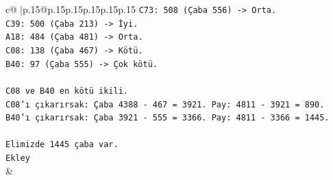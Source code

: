 \documentclass{article}
\begin{document}
{\begin{supertabular}{c@{$\;$}|p{.15\linewidth}@{}p{.15\linewidth}p{.15\linewidth}p{.15\linewidth}p{.15\linewidth}p{.15\linewidth}}
{{{\texttt{C73: 508 (Çaba 556) {-}> Orta.} \\
\texttt{C39: 500 (Çaba 213) {-}> İyi.} \\
\texttt{A18: 484 (Çaba 481) {-}> Orta.} \\
\texttt{C08: 138 (Çaba 467) {-}> Kötü.} \\
\texttt{B40: 97 (Çaba 555) {-}> Çok kötü.} \\
\\ 
\texttt{C08 ve B40 en kötü ikili.} \\
\texttt{C08'ı çıkarırsak: Çaba 4388 {-} 467 = 3921. Pay: 4811 {-} 3921 = 890.} \\
\texttt{B40'ı çıkarırsak: Çaba 3921 {-} 555 = 3366. Pay: 4811 {-} 3366 = 1445.} \\
\\ 
\texttt{Elimizde 1445 çaba var.} \\
\texttt{Ekley} \\
            }
        }
    }
    & \\ \\


\end{supertabular}}
\end{document}
